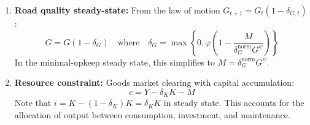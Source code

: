 \begin{enumerate}
    \item \textbf{Road quality steady-state:} From the law of motion $G_{t+1} = G_t(1-\delta_{G,t})$:
    \begin{equation}
    G = G(1-\delta_G) \quad \text{where} \quad \delta_G = \max\left\{0, \varphi\left(1 - \frac{M}{\delta_G^{\text{norm}} G^{\psi}}\right)\right\}
    \end{equation}
    In the minimal-upkeep steady state, this simplifies to $M = \delta_G^{\text{norm}} G^{\psi}$.

    \item \textbf{Resource constraint:} Goods market clearing with capital accumulation:
    \begin{equation}
    c = Y - \delta_K K - M
    \end{equation}
    Note that $i = K - (1-\delta_K)K = \delta_K K$ in steady state. This accounts for the allocation of output between consumption, investment, and maintenance.
\end{enumerate}






